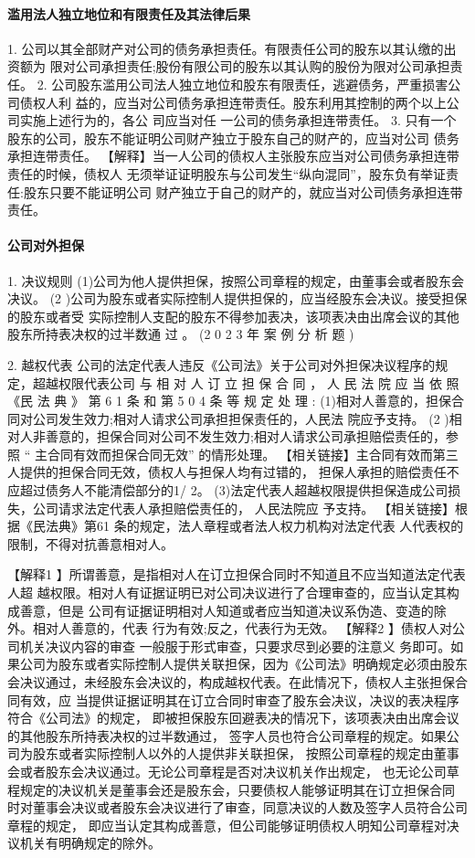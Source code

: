 \documentclass[UTF8,12pt]{ctexart}
\numberwithin{equation}{section} %
\numberwithin{figure}{section}
\numberwithin{table}{section}
\begin{document}
	\paragraph{滥用法人独立地位和有限责任及其法律后果}
	1. 公司以其全部财产对公司的债务承担责任。有限责任公司的股东以其认缴的出资额为 限对公司承担责任;股份有限公司的股东以其认购的股份为限对公司承担责任。
	2. 公司股东滥用公司法人独立地位和股东有限责任，逃避债务，严重损害公司债权人利 益的，应当对公司债务承担连带责任。股东利用其控制的两个以上公司实施上述行为的，各公 司应当对任 一公司的债务承担连带责任。
	3. 只有一个股东的公司，股东不能证明公司财产独立于股东自己的财产的，应当对公司 债务承担连带责任。
	【解释】当一人公司的债权人主张股东应当对公司债务承担连带责任的时候，债权人 无须举证证明股东与公司发生“纵向混同”，股东负有举证责任:股东只要不能证明公司 财产独立于自己的财产的，就应当对公司债务承担连带责任。
	
	\paragraph{公司对外担保}
	1. 决议规则 (1)公司为他人提供担保，按照公司章程的规定，由董事会或者股东会决议。
	(2 )公司为股东或者实际控制人提供担保的，应当经股东会决议。接受担保的股东或者受 实际控制人支配的股东不得参加表决，该项表决由出席会议的其他股东所持表决权的过半数通 过 。 (2 0 2 3 年 案 例 分 析 题 )
	
	2. 越权代表 公司的法定代表人违反《公司法》关于公司对外担保决议程序的规定，超越权限代表公司 与 相 对 人 订 立 担 保 合 同 ， 人 民 法 院 应 当 依 照 《民 法 典 》 第 6 1 条 和 第 5 0 4 条 等 规 定 处 理 : (1)相对人善意的，担保合同对公司发生效力;相对人请求公司承担担保责任的，人民法 院应予支持。
	(2 )相对人非善意的，担保合同对公司不发生效力;相对人请求公司承担赔偿责任的，参 照 “ 主合同有效而担保合同无效” 的情形处理。
	【相关链接】主合同有效而第三人提供的担保合同无效，债权人与担保人均有过错的， 担保人承担的赔偿责任不应超过债务人不能清偿部分的1/ 2。
	(3)法定代表人超越权限提供担保造成公司损失，公司请求法定代表人承担赔偿责任的， 人民法院应 予支持。
	【相关链接】根据《民法典》第61 条的规定，法人章程或者法人权力机构对法定代表 人代表权的限制，不得对抗善意相对人。
	
	【解释1 】所谓善意，是指相对人在订立担保合同时不知道且不应当知道法定代表人超 越权限。相对人有证据证明已对公司决议进行了合理审查的，应当认定其构成善意，但是 公司有证据证明相对人知道或者应当知道决议系伪造、变造的除外。相对人善意的，代表 行为有效;反之，代表行为无效。
	【解释2 】债权人对公司机关决议内容的审查 一般服于形式审查，只要求尽到必要的注意义 务即可。如果公司为股东或者实际控制人提供关联担保，因为《公司法》明确规定必须由股东 会决议通过，未经股东会决议的，构成越权代表。在此情况下，债权人主张担保合同有效，应 当提供证据证明其在订立合同时审查了股东会决议，决议的表决程序符合《公司法》的规定， 即被担保股东回避表决的情况下，该项表决由出席会议的其他股东所持表决权的过半数通过， 签字人员也符合公司章程的规定。如果公司为股东或者实际控制人以外的人提供非关联担保， 按照公司章程的规定由董事会或者股东会决议通过。无论公司章程是否对决议机关作出规定， 也无论公司草程规定的决议机关是董事会还是股东会，只要债权人能够证明其在订立担保合同 时对董事会决议或者股东会决议进行了审查，同意决议的人数及签字人员符合公司章程的规定， 即应当认定其构成善意，但公司能够证明债权人明知公司章程对决议机关有明确规定的除外。
	
\end{document}
